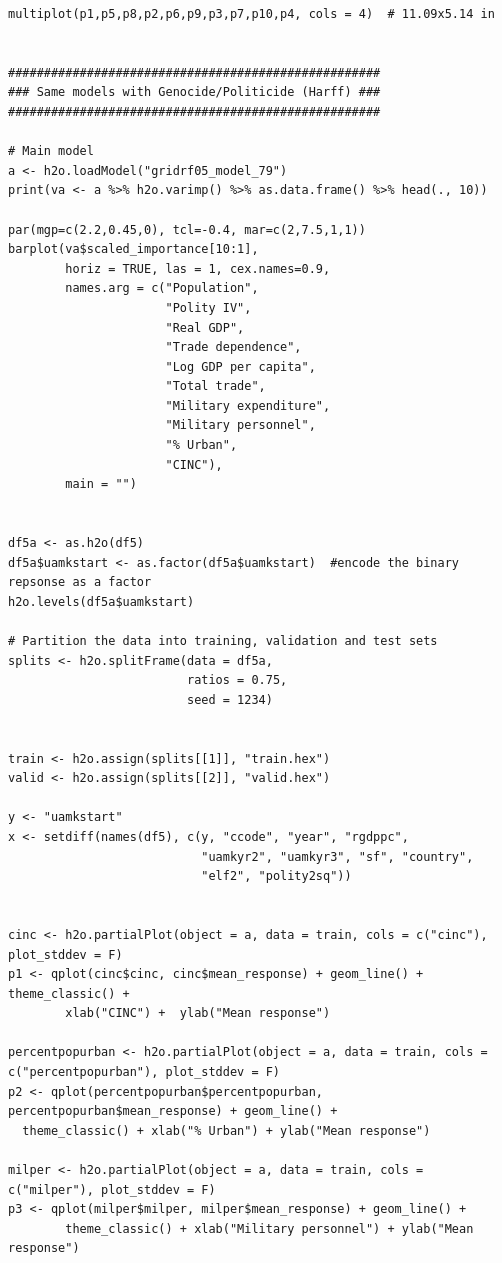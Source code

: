 \begin{verbatim}
multiplot(p1,p5,p8,p2,p6,p9,p3,p7,p10,p4, cols = 4)  # 11.09x5.14 in


####################################################
### Same models with Genocide/Politicide (Harff) ###
####################################################

# Main model
a <- h2o.loadModel("gridrf05_model_79")
print(va <- a %>% h2o.varimp() %>% as.data.frame() %>% head(., 10)) 

par(mgp=c(2.2,0.45,0), tcl=-0.4, mar=c(2,7.5,1,1))
barplot(va$scaled_importance[10:1],
        horiz = TRUE, las = 1, cex.names=0.9,
        names.arg = c("Population",
                      "Polity IV",
                      "Real GDP", 
                      "Trade dependence", 
                      "Log GDP per capita",
                      "Total trade",
                      "Military expenditure", 
                      "Military personnel",
                      "% Urban",
                      "CINC"),
        main = "")


df5a <- as.h2o(df5)
df5a$uamkstart <- as.factor(df5a$uamkstart)  #encode the binary repsonse as a factor
h2o.levels(df5a$uamkstart)

# Partition the data into training, validation and test sets
splits <- h2o.splitFrame(data = df5a, 
                         ratios = 0.75, 
                         seed = 1234) 


train <- h2o.assign(splits[[1]], "train.hex")   
valid <- h2o.assign(splits[[2]], "valid.hex") 

y <- "uamkstart"
x <- setdiff(names(df5), c(y, "ccode", "year", "rgdppc",
                           "uamkyr2", "uamkyr3", "sf", "country",
                           "elf2", "polity2sq")) 


cinc <- h2o.partialPlot(object = a, data = train, cols = c("cinc"), plot_stddev = F)
p1 <- qplot(cinc$cinc, cinc$mean_response) + geom_line() + theme_classic() + 
        xlab("CINC") +  ylab("Mean response")

percentpopurban <- h2o.partialPlot(object = a, data = train, cols = c("percentpopurban"), plot_stddev = F)
p2 <- qplot(percentpopurban$percentpopurban, percentpopurban$mean_response) + geom_line() +
  theme_classic() + xlab("% Urban") + ylab("Mean response")

milper <- h2o.partialPlot(object = a, data = train, cols = c("milper"), plot_stddev = F)
p3 <- qplot(milper$milper, milper$mean_response) + geom_line() +
        theme_classic() + xlab("Military personnel") + ylab("Mean response")


\end{verbatim}

